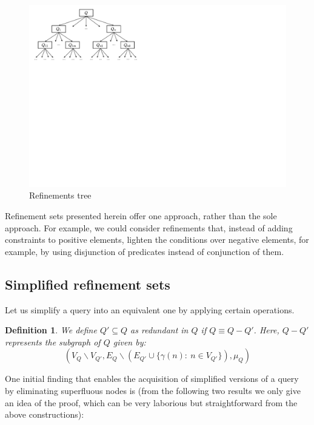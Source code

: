 \documentclass[mathematics,article,submit,pdftex,moreauthors]{Definitions/mdpi}
\newtheorem{definition}{Definition}[section]
\begin{document}
\begin{figure}[h]
    \begin{center}
        \includegraphics[scale=0.3]{png/FIG4.pdf}
    \end{center}
    \caption{%
        Refinements tree
    }%
    \label{arbolGGQ}
\end{figure}

Refinement sets presented herein offer one approach, rather than the sole approach. For example, we could consider refinements that, instead of adding constraints to positive elements, lighten the conditions over negative elements, for example, by using disjunction of predicates instead of conjunction of them.

\subsection{Simplified refinement sets}
\label{simrefs}
Let us simplify a query into an equivalent one by applying certain operations.

\begin{definition}{}
    We define $Q'\subseteq Q$ as \emph{redundant} in $Q$ if $Q\equiv Q-Q'$. Here, $Q-Q'$ represents the subgraph of $Q$ given by:
	$$(V_Q\smallsetminus V_{Q'}, E_Q\smallsetminus (E_{Q'}\cup\{\gamma(n):\ n\in V_{Q'}\}),\mu_Q)$$

\end{definition}\medskip

One initial finding that enables the acquisition of simplified versions of a query by eliminating superfluous nodes is (from the following two results we only give an idea of the proof, which can be very laborious but straightforward from the above constructions):
\end{document}
